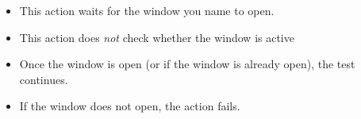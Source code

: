 \begin{itemize}
\item This action waits for the window you name to open.
\item This action does \emph{not} check whether the window is active
\item Once the window is open (or if the window is already open), the test continues.
\item If the window does not open, the action fails.
\end{itemize}
